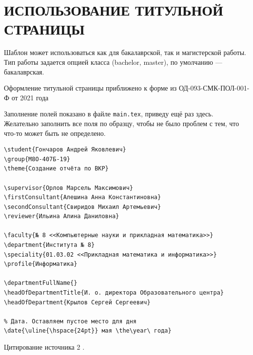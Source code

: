 \section{ИСПОЛЬЗОВАНИЕ ТИТУЛЬНОЙ СТРАНИЦЫ}

Шаблон может использоваться как для бакалаврской, так и магистерской работы.
Тип работы задается опцией класса (bachelor, master), по умолчанию --- бакалаврская.

Оформление титульной страницы приближено к форме из ОД-093-СМК-ПОЛ-001-Ф от 2021 года \cite{mai_forms}

Заполнение полей показано в файле \texttt{main.tex}, приведу ещё раз здесь. 
Желательно заполнить все поля по образцу, чтобы не было проблем с тем, 
что что-то может быть не определено.

\begingroup
\fontsize{10pt}{12pt}\selectfont
\begin{verbatim}
\student{Гончаров Андрей Яковлевич}
\group{М8О-407Б-19}
\theme{Создание отчёта по ВКР}

\supervisor{Орлов Марсель Максимович}
\firstConsultant{Алешина Анна Константиновна}
\secondConsultant{Свиридов Михаил Артемьевич}
\reviewer{Ильина Алина Даниловна}

\faculty{№ 8 <<Компьютерные науки и прикладная математика>>}
\department{Института № 8}
\speciality{01.03.02 <<Прикладная математика и информатика>>}
\profile{Информатика}

\departmentFullName{}
\headOfDepartmentTitle{И. о. директора Образовательного центра}
\headOfDepartment{Крылов Сергей Сергеевич}

% Дата. Оставляем пустое место для дня
\date{\uline{\hspace{24pt}} мая \the\year\ года}
\end{verbatim}
\endgroup

Цитирование источника 2 \cite{Wikipedia2}.